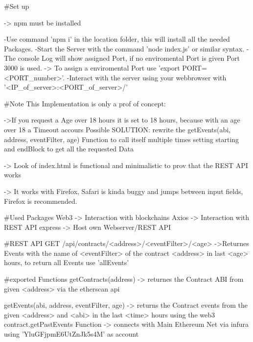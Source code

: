#Set up

-> npm must be installed

    -Use command 'npm i' in the location folder, this will install all the needed Packages.
    -Start the Server with the command 'node index.js' or similar syntax.
    -The console Log will show assigned Port, if no enviromental Port is given Port 3000 is used.
        -> To assign a enviromental Port use 'export PORT=<PORT_number>'.
    -Interact with the server using your webbrowser with '<IP_of_server>:<PORT_of_server>/'

#Note
    This Implementation is only a prof of concept:

    ->If you request a Age over 18 hours it is set to 18 hours, because with an age over 18 a Timeout accours
    Possible SOLUTION:  rewrite the getEvents(abi, address, eventFilter, age) Function to call itself multiple times 
                        setting starting and endBlock to get all the requested Data

    -> Look of index.html is functional and minimalistic to prov that the REST API works

-> It works with Firefox, Safari is kinda buggy and jumps between input fields, Firefox is recommended.


#Used Packages
Web3    -> Interaction with blockchains
Axios   -> Interaction with REST API
express -> Host own Webserver/REST API

#REST API
GET /api/contracts/<address>/<eventFilter>/<age>
    ->Returnes Events with the name of <eventFilter> of the contract <address> in last <age> hours, to
    return all Events use 'allEvents'

#exported Functions
    getContracts(address) 
        -> returnes the Contract ABI from given <address> via the etherscan api

    getEvents(abi, address, eventFilter, age)
        -> returns the Contract events from the given <address> and <abi> in the 
        last <time> hours using the web3 contract.getPastEvents Function
            -> connects with Main Ethereum Net via infura using 'YluGFjpmE6UtZnJk5s4M'
            as account

